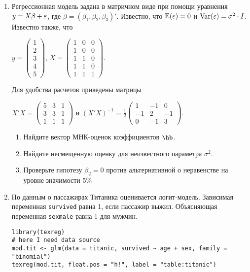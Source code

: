 \documentclass[12pt, a4paper]{article}
\theoremstyle{definition}
\begin{document}
\begin{enumerate}
\item Регрессионная модель  задана в матричном виде при помощи уравнения $y=X\beta+\varepsilon$, где $\beta=(\beta_1,\beta_2,\beta_3)'$.
Известно, что $\mathbb{E}(\varepsilon)=0$  и  $\operatorname{Var}(\varepsilon)=\sigma^2\cdot I$.
Известно также, что

$y=\left(
\begin{array}{c}
1\\
2\\
3\\
4\\
5
\end{array}\right)$,
$X=\left(\begin{array}{ccc}
1 & 0 & 0 \\
1 & 0 & 0 \\
1 & 1 & 0 \\
1 & 1 & 0 \\
1 & 1 & 1
\end{array}\right)$.


Для удобства расчетов приведены матрицы


$X'X=\left(
\begin{array}{ccc}
5 & 3 & 1\\
3 & 3 & 1\\
1 & 1 & 1
\end{array}\right)$ и $(X'X)^{-1}=\frac{1}{2}\left(
\begin{array}{ccc}
1 & -1 & 0 \\
-1 & 2 & -1 \\
0 & -1 & 3
\end{array}\right)$.

\begin{enumerate}
\item Найдите вектор МНК-оценок коэффициентов $\hb$.
\item Найдите несмещенную оценку для неизвестного параметра $\sigma^2$.
\item Проверьте гипотезу $\beta_2=0$ против альтернативной о неравенстве на уровне значимости 5\%

\end{enumerate}




\item По данным о пассажирах Титаника оценивается логит-модель. Зависимая переменная \verb|survived| равна 1, если пассажир выжил. Объясняющая переменная \verb|sexmale| равна 1 для  мужчин.

\begin{verbatim}
library(texreg)
# here I need data source
mod.tit <- glm(data = titanic, survived ~ age + sex, family = "binomial")
texreg(mod.tit, float.pos = "h!", label = "table:titanic")
\end{verbatim}



\end{enumerate}
\end{document}
